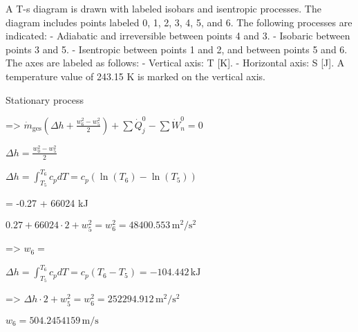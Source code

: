 A T-s diagram is drawn with labeled isobars and isentropic processes. The diagram includes points labeled 0, 1, 2, 3, 4, 5, and 6. The following processes are indicated:  
- Adiabatic and irreversible between points 4 and 3.  
- Isobaric between points 3 and 5.  
- Isentropic between points 1 and 2, and between points 5 and 6.  
The axes are labeled as follows:  
- Vertical axis: T [K].  
- Horizontal axis: S [J].  
A temperature value of 243.15 K is marked on the vertical axis.

Stationary process  

=> \( \dot{m}_{\text{ges}} (\Delta h + \frac{w_6^2 - w_5^2}{2}) + \sum \dot{Q}_j^0 - \sum \dot{W}_n^0 = 0 \)  

\( \Delta h = \frac{w_0^2 - w_5^2}{2} \)  

\( \Delta h = \int_{T_5}^{T_6} c_p dT = c_p (\ln(T_6) - \ln(T_5)) \)  

= -0.27 + 66024 kJ  

\( 0.27 + 66024 \cdot 2 + w_5^2 = w_6^2 = 48400.553 \, \text{m}^2/\text{s}^2 \)  

=> \( w_6 = \)  

\( \Delta h = \int_{T_5}^{T_6} c_p dT = c_p (T_6 - T_5) = -104.442 \, \text{kJ} \)  

=> \( \Delta h \cdot 2 + w_5^2 = w_6^2 = 252294.912 \, \text{m}^2/\text{s}^2 \)  

\( w_6 = 504.2454159 \, \text{m/s} \)